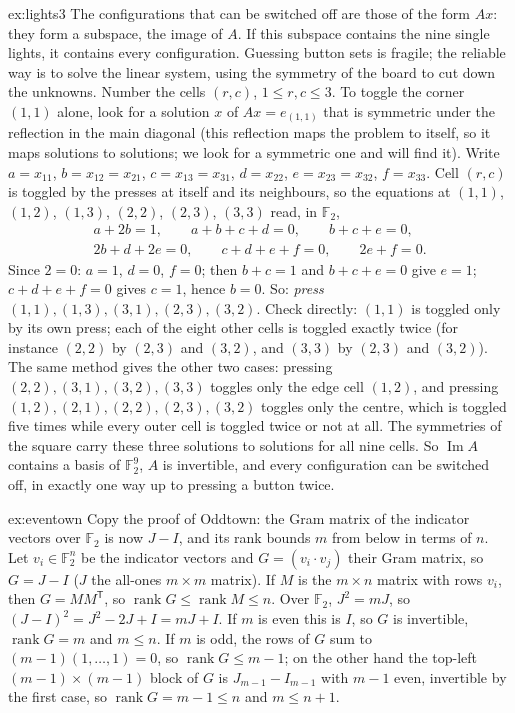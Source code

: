 \begin{solution}{ex:lights3}
\idea The configurations that can be switched off are those of the form $Ax$: they form a subspace, the image of $A$. If
this subspace contains the nine single lights, it contains every configuration. Guessing button sets is fragile; the
reliable way is to solve the linear system, using the symmetry of the board to cut down the unknowns.
\writeup Number the cells $(r,c)$, $1\le r,c\le3$. To toggle the corner $(1,1)$ alone, look for a solution $x$ of
$Ax=e_{(1,1)}$ that is symmetric under the reflection in the main diagonal (this reflection maps the problem to itself, so
it maps solutions to solutions; we look for a symmetric one and will find it). Write $a=x_{11}$, $b=x_{12}=x_{21}$,
$c=x_{13}=x_{31}$, $d=x_{22}$, $e=x_{23}=x_{32}$, $f=x_{33}$. Cell $(r,c)$ is toggled by the presses at itself and its
neighbours, so the equations at $(1,1)$, $(1,2)$, $(1,3)$, $(2,2)$, $(2,3)$, $(3,3)$ read, in $\mathbb F_2$,
\[
\begin{gathered}a+2b=1,\qquad a+b+c+d=0,\qquad b+c+e=0,\\ 2b+d+2e=0,\qquad c+d+e+f=0,\qquad 2e+f=0 .\end{gathered}
\]
Since $2=0$: $a=1$, $d=0$, $f=0$; then $b+c=1$ and $b+c+e=0$ give $e=1$; $c+d+e+f=0$ gives $c=1$, hence $b=0$. So:
\emph{press $(1,1),(1,3),(3,1),(2,3),(3,2)$}. Check directly: $(1,1)$ is toggled only by its own press; each of the eight
other cells is toggled exactly twice (for instance $(2,2)$ by $(2,3)$ and $(3,2)$, and $(3,3)$ by $(2,3)$ and $(3,2)$).
The same method gives the other two cases: pressing $(2,2),(3,1),(3,2),(3,3)$ toggles only the edge cell $(1,2)$, and
pressing $(1,2),(2,1),(2,2),(2,3),(3,2)$ toggles only the centre, which is toggled five times while every outer cell is
toggled twice or not at all. The symmetries of the square carry these three solutions to solutions for all nine cells.
So $\operatorname{Im}A$ contains a basis of $\mathbb F_2^9$, $A$ is invertible, and every configuration can be switched
off, in exactly one way up to pressing a button twice.
\end{solution}

\begin{solution}{ex:eventown}
\idea Copy the proof of Oddtown: the Gram matrix of the indicator vectors over $\mathbb F_2$ is now $J-I$, and its rank
bounds $m$ from below in terms of $n$.
\writeup Let $v_i\in\mathbb F_2^n$ be the indicator vectors and $G=(v_i\cdot v_j)$ their Gram matrix, so $G=J-I$ ($J$ the
all-ones $m\times m$ matrix). If $M$ is the $m\times n$ matrix with rows $v_i$, then $G=MM^{\mathsf T}$, so
$\operatorname{rank}G\le\operatorname{rank}M\le n$. Over $\mathbb F_2$, $J^2=mJ$, so $(J-I)^2=J^2-2J+I=mJ+I$. If $m$ is
even this is $I$, so $G$ is invertible, $\operatorname{rank}G=m$ and $m\le n$. If $m$ is odd, the rows of $G$ sum to
$(m-1)(1,\dots,1)=0$, so $\operatorname{rank}G\le m-1$; on the other hand the top-left $(m-1)\times(m-1)$ block of $G$ is
$J_{m-1}-I_{m-1}$ with $m-1$ even, invertible by the first case, so $\operatorname{rank}G=m-1\le n$ and $m\le n+1$.
\end{solution}

